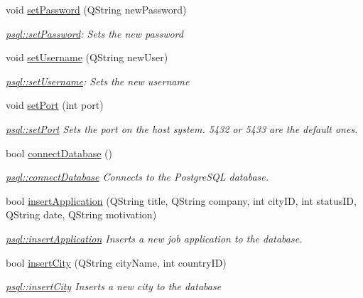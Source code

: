 \begin{DoxyCompactItemize}
void \mbox{\hyperlink{classpsql_a6c29350037550b7e5a5bb8f439c405f3}{set\+Password}} (Q\+String new\+Password)
\begin{DoxyCompactList}\small\item\em \mbox{\hyperlink{classpsql_a6c29350037550b7e5a5bb8f439c405f3}{psql\+::set\+Password}}\+: Sets the new password \end{DoxyCompactList}\item 
void \mbox{\hyperlink{classpsql_a1488a9e4909abd172651b7be240342cb}{set\+Username}} (Q\+String new\+User)
\begin{DoxyCompactList}\small\item\em \mbox{\hyperlink{classpsql_a1488a9e4909abd172651b7be240342cb}{psql\+::set\+Username}}\+: Sets the new username \end{DoxyCompactList}\item 
void \mbox{\hyperlink{classpsql_a62447c990c5c9f8deb6b8f6497117bfc}{set\+Port}} (int port)
\begin{DoxyCompactList}\small\item\em \mbox{\hyperlink{classpsql_a62447c990c5c9f8deb6b8f6497117bfc}{psql\+::set\+Port}} Sets the port on the host system. 5432 or 5433 are the default ones. \end{DoxyCompactList}\item 
bool \mbox{\hyperlink{classpsql_ada485c933df77453629e3821ab19fa4c}{connect\+Database}} ()
\begin{DoxyCompactList}\small\item\em \mbox{\hyperlink{classpsql_ada485c933df77453629e3821ab19fa4c}{psql\+::connect\+Database}} Connects to the Postgre\+S\+QL database. \end{DoxyCompactList}\item 
bool \mbox{\hyperlink{classpsql_a03f773904e698853caa0fcdb1f5b3809}{insert\+Application}} (Q\+String title, Q\+String company, int city\+ID, int status\+ID, Q\+String date, Q\+String motivation)
\begin{DoxyCompactList}\small\item\em \mbox{\hyperlink{classpsql_a03f773904e698853caa0fcdb1f5b3809}{psql\+::insert\+Application}} Inserts a new job application to the database. \end{DoxyCompactList}\item 
bool \mbox{\hyperlink{classpsql_a767b85014d9df3eac148730f18888d6d}{insert\+City}} (Q\+String city\+Name, int country\+ID)
\begin{DoxyCompactList}\small\item\em \mbox{\hyperlink{classpsql_a767b85014d9df3eac148730f18888d6d}{psql\+::insert\+City}} Inserts a new city to the database \end{DoxyCompactList}\item 

\end{DoxyCompactItemize}
